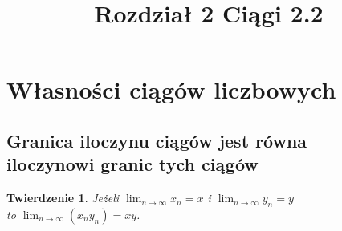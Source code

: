 \documentclass[12pt, letterpaper, twoside]{article}
\title{Rozdział 2 Ciągi 2.2}
\author{}
\date{}
\newtheorem{theorem}{Twierdzenie}
\begin{document}
\begin{titlepage}
\maketitle
\end{titlepage}


\section{Własności ciągów liczbowych}
\subsection{Granica iloczynu ciągów jest równa \\ iloczynowi granic tych ciągów}



\begin{theorem}
    
    Jeżeli $\lim_{n\to\infty} x_n = x$ i $\lim_{n\to\infty} y_n = y$ \\
     to $\lim_{n\to\infty} (x_{n}y_{n}) = xy$.

\end{theorem}
\end{document}
